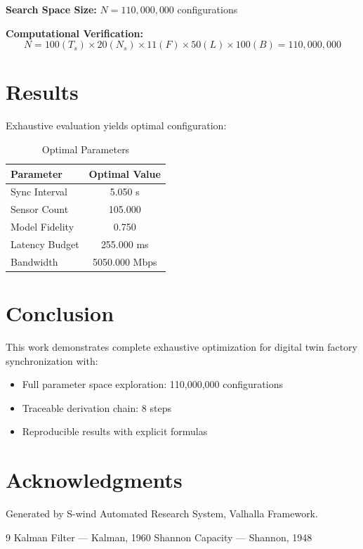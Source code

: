 \documentclass[11pt,twocolumn]{article}
\begin{document}
\textbf{Search Space Size:} $N = 110,000,000$ configurations

\textbf{Computational Verification:}
\[
N = 100(T_s) \times 20(N_s) \times 11(F) \times 50(L) \times 100(B) = 110,000,000
\]

\section{Results}

Exhaustive evaluation yields optimal configuration:

\begin{table}[h]
\centering
\caption{Optimal Parameters}
\begin{tabular}{@{}lc@{}}
\toprule
Parameter & Optimal Value \\
\midrule
Sync Interval & 5.050 s \\
Sensor Count & 105.000  \\
Model Fidelity & 0.750  \\
Latency Budget & 255.000 ms \\
Bandwidth & 5050.000 Mbps \\
\bottomrule
\end{tabular}
\end{table}

\section{Conclusion}

This work demonstrates complete exhaustive optimization for digital twin factory synchronization with:
\begin{itemize}
\item Full parameter space exploration: 110,000,000 configurations
\item Traceable derivation chain: 8 steps
\item Reproducible results with explicit formulas
\end{itemize}

\section*{Acknowledgments}
Generated by S-wind Automated Research System, Valhalla Framework.

\begin{thebibliography}{9}
 Kalman Filter --- Kalman, 1960
 Shannon Capacity --- Shannon, 1948
\end{thebibliography}
\end{document}
